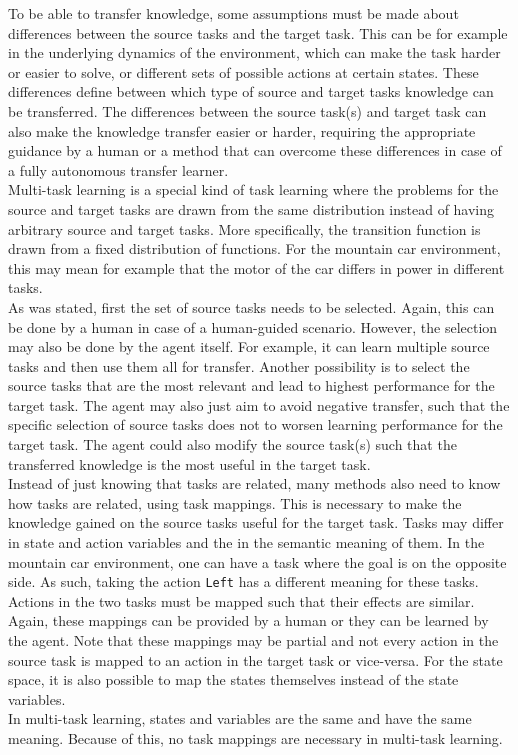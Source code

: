 \documentclass[a4paper, 11pt]{article}
\begin{document}
To be able to transfer knowledge, some assumptions must be made about differences between the source tasks and the target task. This can be for example in the underlying dynamics of the environment, which can make the task harder or easier to solve, or different sets of possible actions at certain states. These differences define between which type of source and target tasks knowledge can be transferred. The differences between the source task(s) and target task can also make the knowledge transfer easier or harder, requiring the appropriate guidance by a human or a method that can overcome these differences in case of a fully autonomous transfer learner.\\
Multi-task learning is a special kind of task learning where the problems for the source and target tasks are drawn from the same distribution instead of having arbitrary source and target tasks. More specifically, the transition function is drawn from a fixed distribution of functions. For the mountain car environment, this may mean for example that the motor of the car differs in power in different tasks.\\

As was stated, first the set of source tasks needs to be selected. Again, this can be done by a human in case of a human-guided scenario. However, the selection may also be done by the agent itself. For example, it can learn multiple source tasks and then use them all for transfer. Another possibility is to select the source tasks that are the most relevant and lead to highest performance for the target task. The agent may also just aim to avoid negative transfer, such that the specific selection of source tasks does not to worsen learning performance for the target task.
The agent could also modify the source task(s) such that the transferred knowledge is the most useful in the target task.\\

Instead of just knowing that tasks are related, many methods also need to know how tasks are related, using task mappings. This is necessary to make the knowledge gained on the source tasks useful for the target task. Tasks may differ in state and action variables and the in the semantic meaning of them. In the mountain car environment, one can have a task where the goal is on the opposite side. As such, taking the action \texttt{Left} has a different meaning for these tasks. Actions in the two tasks must be mapped such that their effects are similar.\\
Again, these mappings can be provided by a human or they can be learned by the agent. Note that these mappings may be partial and not every action in the source task is mapped to an action in the target task or vice-versa. For the state space, it is also possible to map the states themselves instead of the state variables.\\
In multi-task learning, states and variables are the same and have the same meaning. Because of this, no task mappings are necessary in multi-task learning.\\
\end{document}
